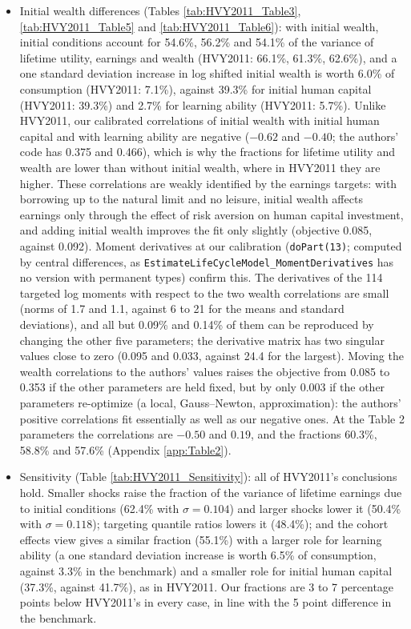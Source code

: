 \documentclass[11pt,fleqn]{article}
\begin{document}
\begin{itemize}
 \item Initial wealth differences (Tables \ref{tab:HVY2011_Table3}, \ref{tab:HVY2011_Table5} and \ref{tab:HVY2011_Table6}): with initial wealth, initial conditions account for 54.6\%, 56.2\% and 54.1\% of the variance of lifetime utility, earnings and wealth (HVY2011: 66.1\%, 61.3\%, 62.6\%), and a one standard deviation increase in log shifted initial wealth is worth 6.0\% of consumption (HVY2011: 7.1\%), against 39.3\% for initial human capital (HVY2011: 39.3\%) and 2.7\% for learning ability (HVY2011: 5.7\%). Unlike HVY2011, our calibrated correlations of initial wealth with initial human capital and with learning ability are negative ($-0.62$ and $-0.40$; the authors' code has 0.375 and 0.466), which is why the fractions for lifetime utility and wealth are lower than without initial wealth, where in HVY2011 they are higher. These correlations are weakly identified by the earnings targets: with borrowing up to the natural limit and no leisure, initial wealth affects earnings only through the effect of risk aversion on human capital investment, and adding initial wealth improves the fit only slightly (objective 0.085, against 0.092). Moment derivatives at our calibration (\verb|doPart(13)|; computed by central differences, as \verb|EstimateLifeCycleModel_MomentDerivatives| has no version with permanent types) confirm this. The derivatives of the 114 targeted log moments with respect to the two wealth correlations are small (norms of 1.7 and 1.1, against 6 to 21 for the means and standard deviations), and all but 0.09\% and 0.14\% of them can be reproduced by changing the other five parameters; the derivative matrix has two singular values close to zero (0.095 and 0.033, against 24.4 for the largest). Moving the wealth correlations to the authors' values raises the objective from 0.085 to 0.353 if the other parameters are held fixed, but by only 0.003 if the other parameters re-optimize (a local, Gauss--Newton, approximation): the authors' positive correlations fit essentially as well as our negative ones. At the Table 2 parameters the correlations are $-0.50$ and $0.19$, and the fractions 60.3\%, 58.8\% and 57.6\% (Appendix \ref{app:Table2}).
 \item Sensitivity (Table \ref{tab:HVY2011_Sensitivity}): all of HVY2011's conclusions hold. Smaller shocks raise the fraction of the variance of lifetime earnings due to initial conditions (62.4\% with $\sigma=0.104$) and larger shocks lower it (50.4\% with $\sigma=0.118$); targeting quantile ratios lowers it (48.4\%); and the cohort effects view gives a similar fraction (55.1\%) with a larger role for learning ability (a one standard deviation increase is worth 6.5\% of consumption, against 3.3\% in the benchmark) and a smaller role for initial human capital (37.3\%, against 41.7\%), as in HVY2011. Our fractions are 3 to 7 percentage points below HVY2011's in every case, in line with the 5 point difference in the benchmark.

\end{itemize}
\end{document}

